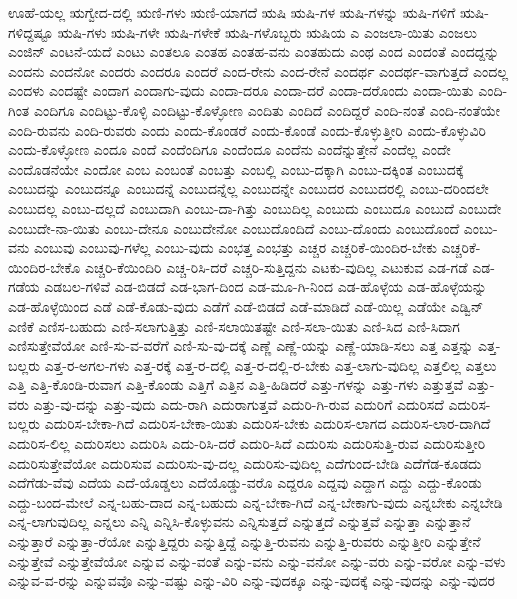 {ಊಹೆ-ಯಲ್ಲ
ಋಗ್ವೇದ-ದಲ್ಲಿ
ಋಣಿ-ಗಳು
ಋಣಿ-ಯಾಗದೆ
ಋಷಿ
ಋಷಿ-ಗಳ
ಋಷಿ-ಗಳನ್ನು
ಋಷಿ-ಗಳಿಗೆ
ಋಷಿ-ಗಳಿದ್ದಷ್ಟೂ
ಋಷಿ-ಗಳು
ಋಷಿ-ಗಳೇ
ಋಷಿ-ಗಳೇಕೆ
ಋಷಿ-ಗಳೊಬ್ಬರು
ಋಷಿಯ
ಎ
ಎಂಜಲಾ-ಯಿತು
ಎಂಜಲು
ಎಂಜಿನ್
ಎಂಟನೆ-ಯದೆ
ಎಂಟು
ಎಂತಲೂ
ಎಂತಹ
ಎಂತಹ-ವನು
ಎಂತಹುದು
ಎಂಥ
ಎಂದ
ಎಂದಂತೆ
ಎಂದದ್ದನ್ನು
ಎಂದನು
ಎಂದನೋ
ಎಂದರು
ಎಂದರೂ
ಎಂದರೆ
ಎಂದ-ರೇನು
ಎಂದ-ರೇನೆ
ಎಂದರ್ಥ
ಎಂದರ್ಥ-ವಾಗುತ್ತದೆ
ಎಂದಲ್ಲ
ಎಂದಳು
ಎಂದಷ್ಟೇ
ಎಂದಾಗ
ಎಂದಾಗು-ವುದು
ಎಂದಾ-ದರೂ
ಎಂದಾ-ದರೆ
ಎಂದಾ-ದರೊಂದು
ಎಂದಾ-ಯಿತು
ಎಂದಿ-ಗಿಂತ
ಎಂದಿಗೂ
ಎಂದಿಟ್ಟು-ಕೊಳ್ಳಿ
ಎಂದಿಟ್ಟು-ಕೊಳ್ಳೋಣ
ಎಂದಿತು
ಎಂದಿದೆ
ಎಂದಿದ್ದರೆ
ಎಂದಿ-ನಂತೆ
ಎಂದಿ-ನಂತೆಯೇ
ಎಂದಿ-ರುವನು
ಎಂದಿ-ರುವರು
ಎಂದು
ಎಂದು-ಕೊಂಡರೆ
ಎಂದು-ಕೊಂಡೆ
ಎಂದು-ಕೊಳ್ಳುತ್ತೀರಿ
ಎಂದು-ಕೊಳ್ಳುವಿರಿ
ಎಂದು-ಕೊಳ್ಳೋಣ
ಎಂದೂ
ಎಂದೆ
ಎಂದೆಂದಿಗೂ
ಎಂದೆಂದೂ
ಎಂದೆನು
ಎಂದೆನ್ನುತ್ತೇನೆ
ಎಂದೆಲ್ಲ
ಎಂದೇ
ಎಂದೊಡನೆಯೇ
ಎಂದೋ
ಎಂಬ
ಎಂಬಂತೆ
ಎಂಬತ್ತು
ಎಂಬಲ್ಲಿ
ಎಂಬು-ದಕ್ಕಾಗಿ
ಎಂಬು-ದಕ್ಕಿಂತ
ಎಂಬುದಕ್ಕೆ
ಎಂಬುದನ್ನು
ಎಂಬುದನ್ನೂ
ಎಂಬುದನ್ನೆ
ಎಂಬುದನ್ನೆಲ್ಲ
ಎಂಬುದನ್ನೇ
ಎಂಬುದರ
ಎಂಬುದರಲ್ಲಿ
ಎಂಬು-ದರಿಂದಲೇ
ಎಂಬುದಲ್ಲ
ಎಂಬು-ದಲ್ಲದೆ
ಎಂಬುದಾಗಿ
ಎಂಬು-ದಾ-ಗಿತ್ತು
ಎಂಬುದಿಲ್ಲ
ಎಂಬುದು
ಎಂಬುದೂ
ಎಂಬುದೆ
ಎಂಬುದೇ
ಎಂಬುದೇ-ನಾ-ಯಿತು
ಎಂಬು-ದೇನೂ
ಎಂಬುದೇನೋ
ಎಂಬುದೊಂದಿದೆ
ಎಂಬು-ದೊಂದು
ಎಂಬುದೊಂದೆ
ಎಂಬು-ವನು
ಎಂಬುವು
ಎಂಬುವು-ಗಳೆಲ್ಲ
ಎಂಬು-ವುದು
ಎಂಭತ್ತ
ಎಂಭತ್ತು
ಎಚ್ಚರ
ಎಚ್ಚರಿಕೆ-ಯಿಂದಿರ-ಬೇಕು
ಎಚ್ಚರಿಕೆ-ಯಿಂದಿರ-ಬೇಕೊ
ಎಚ್ಚರಿ-ಕೆಯಿಂದಿರಿ
ಎಚ್ಚ-ರಿಸಿ-ದರೆ
ಎಚ್ಚರಿ-ಸುತ್ತಿದ್ದನು
ಎಟಕು-ವುದಿಲ್ಲ
ಎಟುಕುವ
ಎಡ-ಗಡೆ
ಎಡ-ಗಡೆಯ
ಎಡಬಲ-ಗಳಿವೆ
ಎಡ-ಬಿಡದೆ
ಎಡ-ಭಾಗ-ದಿಂದ
ಎಡ-ಮೂ-ಗಿ-ನಿಂದ
ಎಡ-ಹೊಳ್ಳೆಯ
ಎಡ-ಹೊಳ್ಳೆಯನ್ನು
ಎಡ-ಹೊಳ್ಳೆಯಿಂದ
ಎಡೆ
ಎಡೆ-ಕೊಡು-ವುದು
ಎಡೆಗೆ
ಎಡೆ-ಬಿಡದೆ
ಎಡೆ-ಮಾಡಿದೆ
ಎಡೆ-ಯಿಲ್ಲ
ಎಡೆಯೇ
ಎಡ್ವಿನ್
ಎಣಿಕೆ
ಎಣಿಸ-ಬಹುದು
ಎಣಿ-ಸಲಾಗುತ್ತಿತ್ತು
ಎಣಿ-ಸಲಾಯಿತಷ್ಟೇ
ಎಣಿ-ಸಲಾ-ಯಿತು
ಎಣಿ-ಸಿದ
ಎಣಿ-ಸಿದಾಗ
ಎಣಿಸುತ್ತೇವೆಯೋ
ಎಣಿ-ಸು-ವ-ವರೆಗೆ
ಎಣಿ-ಸು-ವು-ದಕ್ಕೆ
ಎಣ್ಣೆ
ಎಣ್ಣೆ-ಯನ್ನು
ಎಣ್ಣೆ-ಯಾಡಿ-ಸಲು
ಎತ್ತ
ಎತ್ತನ್ನು
ಎತ್ತ-ಬಲ್ಲರು
ಎತ್ತ-ರ-ಅಗಲ-ಗಳು
ಎತ್ತ-ರಕ್ಕೆ
ಎತ್ತ-ರ-ದಲ್ಲಿ
ಎತ್ತ-ರ-ದಲ್ಲಿ-ರ-ಬೇಕು
ಎತ್ತ-ಲಾಗು-ವುದಿಲ್ಲ
ಎತ್ತಲಿಲ್ಲ
ಎತ್ತಲು
ಎತ್ತಿ
ಎತ್ತಿ-ಕೊಂಡಿ-ರುವಾಗ
ಎತ್ತಿ-ಕೊಂಡು
ಎತ್ತಿಗೆ
ಎತ್ತಿನ
ಎತ್ತಿ-ಹಿಡಿದರೆ
ಎತ್ತು-ಗಳನ್ನು
ಎತ್ತು-ಗಳು
ಎತ್ತುತ್ತವೆ
ಎತ್ತು-ವರು
ಎತ್ತು-ವು-ದನ್ನು
ಎತ್ತು-ವುದು
ಎದು-ರಾಗಿ
ಎದುರಾಗುತ್ತವೆ
ಎದುರಿ-ಗಿ-ರುವ
ಎದುರಿಗೆ
ಎದುರಿಸದೆ
ಎದುರಿಸ-ಬಲ್ಲರು
ಎದುರಿಸ-ಬೇಕಾ-ಗಿದೆ
ಎದುರಿಸ-ಬೇಕಾ-ಯಿತು
ಎದುರಿಸ-ಬೇಕು
ಎದುರಿಸ-ಲಾಗದ
ಎದುರಿಸ-ಲಾರ-ದಾಗಿದೆ
ಎದುರಿಸ-ಲಿಲ್ಲ
ಎದುರಿಸಲು
ಎದುರಿಸಿ
ಎದು-ರಿಸಿ-ದರೆ
ಎದುರಿ-ಸಿದೆ
ಎದುರಿಸು
ಎದುರಿಸುತ್ತಿ-ರುವ
ಎದುರಿಸುತ್ತೀರಿ
ಎದುರಿಸುತ್ತೇವೆಯೋ
ಎದುರಿಸುವ
ಎದುರಿಸು-ವು-ದಲ್ಲ
ಎದುರಿಸು-ವುದಿಲ್ಲ
ಎದೆಗುಂದ-ಬೇಡಿ
ಎದೆಗೆಡ-ಕೂಡದು
ಎದೆಗೆಡು-ವೆವು
ಎದೆಯ
ಎದೆ-ಯೊಡ್ಡಲು
ಎದೆಯೊಡ್ಡು-ವರೊ
ಎದ್ದರೂ
ಎದ್ದವು
ಎದ್ದಾಗ
ಎದ್ದು
ಎದ್ದು-ಕೊಂಡು
ಎದ್ದು-ಬಂದ-ಮೇಲೆ
ಎನ್ನ-ಬಹು-ದಾದ
ಎನ್ನ-ಬಹುದು
ಎನ್ನ-ಬೇಕಾ-ಗಿದೆ
ಎನ್ನ-ಬೇಕಾಗು-ವುದು
ಎನ್ನಬೇಕು
ಎನ್ನಬೇಡಿ
ಎನ್ನ-ಲಾಗುವುದಿಲ್ಲ
ಎನ್ನಲು
ಎನ್ನಿ
ಎನ್ನಿಸಿ-ಕೊಳ್ಳುವನು
ಎನ್ನಿಸುತ್ತದೆ
ಎನ್ನುತ್ತದೆ
ಎನ್ನುತ್ತವೆ
ಎನ್ನುತ್ತಾ
ಎನ್ನುತ್ತಾನೆ
ಎನ್ನುತ್ತಾರೆ
ಎನ್ನುತ್ತಾ-ರೆಯೋ
ಎನ್ನುತ್ತಿದ್ದರು
ಎನ್ನುತ್ತಿದ್ದೆ
ಎನ್ನುತ್ತಿ-ರುವನು
ಎನ್ನುತ್ತಿ-ರುವರು
ಎನ್ನುತ್ತೀರಿ
ಎನ್ನುತ್ತೇನೆ
ಎನ್ನುತ್ತೇವೆ
ಎನ್ನುತ್ತೇವೆಯೋ
ಎನ್ನುವ
ಎನ್ನು-ವಂತೆ
ಎನ್ನು-ವನು
ಎನ್ನು-ವನೋ
ಎನ್ನು-ವರು
ಎನ್ನು-ವರೋ
ಎನ್ನು-ವಳು
ಎನ್ನುವ-ವ-ರನ್ನು
ಎನ್ನುವವೊ
ಎನ್ನು-ವಷ್ಟು
ಎನ್ನು-ವಿರಿ
ಎನ್ನು-ವುದಕ್ಕೂ
ಎನ್ನು-ವುದಕ್ಕೆ
ಎನ್ನು-ವುದನ್ನು
ಎನ್ನು-ವುದರ
}
